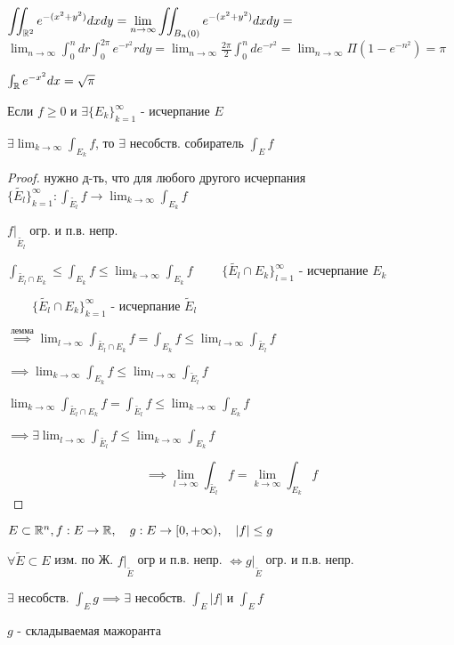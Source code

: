     \begin{illustration}
        $\displaystyle \iint_{\mathbb{R}^2} e^{-(x^2+y^2)} dxdy= \lim_{n\to\infty} \iint_{B_n(0)} e^{-(x^2+y^2)}dxdy = $
        $\displaystyle
        \lim_{n\to\infty} \int^n_0 dr \int^{2\pi}_0 e^{-r^2}rdy = 
        \lim_{n\to\infty} \frac{2\pi}{2} \int^n_0 de^{-r^2} = \lim_{n\to\infty}\Pi(1-e^{-n^2}) = \pi$

        $\int_{\mathbb{R}} e^{-x^2}dx = \sqrt{\pi}$
    \end{illustration}

    \begin{lemma}
        Если $f \ge 0$ и $\exists \{ E_k\}^\infty_{k=1}$ - исчерпание $E$

        $\displaystyle\exists \lim_{k\to\infty} \int_{E_k}f$, то $\exists$ несобств. собиратель $\int_E f$

    \end{lemma}
    \begin{proof}
        нужно д-ть, что для любого другого исчерпания 
        $\{\widetilde{E_l}\}^\infty_{k=1}: \int_{\widetilde{E_l}}f \to \lim_{k\to\infty}\int_{E_k}f$
        
        $f|\underset{\widetilde{E_l}}{ }$ огр. и п.в. непр.

        $\int_{\widetilde{E_l}\cap E_k} \le \int_{E_k}f \le \lim_{k\to\infty} \int_{E_k} f$
        $\qquad \{\widetilde{E_l}\cap E_k\}^\infty_{l=1}$ - исчерпание $E_k$

        $\qquad \{\widetilde{E_l}\cap E_k\}^\infty_{k=1}$ - исчерпание $\widetilde E_l$

        $\overset{\text{лемма}}{\implies} \lim_{l \to \infty} \int_{\widetilde{E_l} \cap E_k}f = \int_{E_k} f \le \lim_{l\to\infty} \int_{\widetilde{E_l}} f$ %
        
        $\implies \lim_{k\to\infty} \int_{E_k} f \le \lim_{l\to\infty} \int_{\widetilde E_l} f$

        $\lim_{k\to\infty} \int_{\widetilde{E_l}\cap E_k} f= \int_{\widetilde{E_l}} f \le \lim_{k\to\infty} \int_{E_k}f$

        $\implies \exists \lim_{l\to\infty}\int_{\widetilde{E_l}} f \le \lim_{k\to\infty}\int_{E_k} f$

        $$\implies \lim_{l\to\infty} \int_{\widetilde{E_l}} f = \lim_{k\to\infty} \int_{E_k} f$$
    \end{proof}

    \begin{lemma}
        $E \subset \mathbb{R}^n, f: E \to \mathbb{R},\quad g: E \to [0, + \infty),\quad |f| \le g$

        $\forall \widetilde{E} \subset E$ изм. по Ж. $f| \underset{\widetilde{E}}{ }$ огр и п.в. непр.
        $\iff g|\underset{\widetilde{E}}{ }$ огр. и п.в. непр.

        $\exists $ несобств. $\int_E g \implies \exists $ несобств. $\int_E |f|$ и $\int_E f$

        $g$ - складываемая мажоранта %
    \end{lemma}


